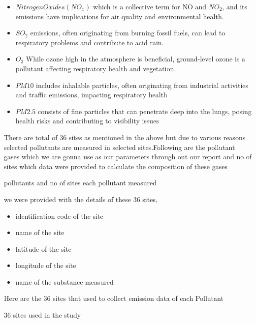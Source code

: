 \documentclass[]{article}
\begin{document}
\begin{itemize}
	\item $Nitrogen Oxides (NO_x)$  which is a collective term for NO and $NO_{2}$, and its emissions have implications for air quality and environmental health.

  	\item	$SO_2$ emissions, often originating from burning fossil fuels, can lead to respiratory problems and contribute to acid rain.
  	\item$O_3$ While ozone high in the atmosphere is beneficial, ground-level ozone is a pollutant affecting respiratory health and vegetation.
  	\item$PM10$ includes inhalable particles, often originating from industrial activities and traffic emissions, impacting respiratory health
    \item$PM2.5$ consists of fine particles that can penetrate deep into the lungs, posing health risks and contributing to visibility issues 
\end{itemize}

There are total of 36 sites as mentioned in the above but due to various reasons selected pollutants are measured in selected sites.Following are the pollutant gases which we are gonna use as our parameters through out our report and no of sites which data were provided to calculate the composition of these gases

\begin{table}[H]
	\centering
	\caption{pollutants and no of sites each pollutant measured}
	\label{tab:parametercounts}
\end{table}


we were provided with the details of these 36 sites,

\begin{itemize}
	\item identification code of the site
	\item name of the site
	\item latitude of the site
	\item longitude of the site
	\item name of the substance measured
\end{itemize}

\pagebreak

Here are the 36 sites that used to collect emission data of each Pollutant

\begin{table}[H]
	\centering
	\caption{36 sites used in the study}
	\label{tab:sitedetails}
\end{table}
\end{document}
